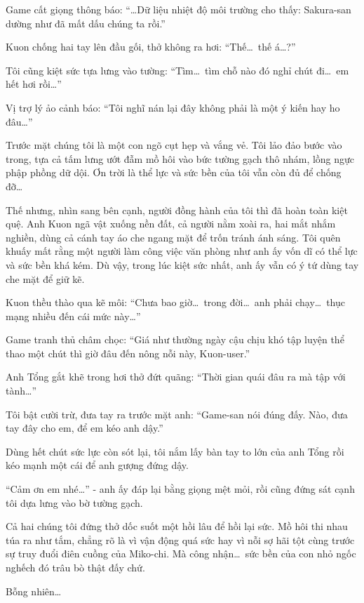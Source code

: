 \documentclass[../main.tex]{subfiles}
\begin{document}
Game cất giọng thông báo: ``\dots Dữ liệu nhiệt độ môi trường cho thấy: Sakura-san dường như đã mất dấu chúng ta rồi.''

Kuon chống hai tay lên đầu gối, thở không ra hơi: ``Thế\dots\ thế á\dots?''

Tôi cũng kiệt sức tựa lưng vào tường: ``Tìm\dots\ tìm chỗ nào đó nghỉ chút đi\dots\ em hết hơi rồi\dots''

Vị trợ lý ảo cảnh báo: ``Tôi nghĩ nán lại đây không phải là một ý kiến hay ho đâu\dots''

Trước mặt chúng tôi là một con ngõ cụt hẹp và vắng vẻ. Tôi lảo đảo bước vào trong, tựa cả tấm lưng ướt đẫm mồ hôi vào bức tường gạch thô nhám, lồng ngực phập phồng dữ dội. Ơn trời là thể lực và sức bền của tôi vẫn còn đủ để chống đỡ\dots

Thế nhưng, nhìn sang bên cạnh, người đồng hành của tôi thì đã hoàn toàn kiệt quệ. Anh Kuon ngã vật xuống nền đất, cả người nằm xoài ra, hai mắt nhắm nghiền, dùng cả cánh tay áo che ngang mặt để trốn tránh ánh sáng. Tôi quên khuấy mất rằng một người làm công việc văn phòng như anh ấy vốn dĩ có thể lực và sức bền khá kém. Dù vậy, trong lúc kiệt sức nhất, anh ấy vẫn có ý tứ dùng tay che mặt để giữ kẽ.


Kuon thều thào qua kẽ môi: ``Chưa bao giờ\dots\ trong đời\dots\ anh phải chạy\dots\ thục mạng nhiều đến cái mức này\dots''

Game tranh thủ châm chọc: ``Giá như thường ngày cậu chịu khó tập luyện thể thao một chút thì giờ đâu đến nông nỗi này, Kuon-user.''

Anh Tổng gắt khẽ trong hơi thở đứt quãng: ``Thời gian quái đâu ra mà tập với tành\dots''

Tôi bật cười trừ, đưa tay ra trước mặt anh: ``Game-san nói đúng đấy. Nào, đưa tay đây cho em, để em kéo anh dậy.''

Dùng hết chút sức lực còn sót lại, tôi nắm lấy bàn tay to lớn của anh Tổng rồi kéo mạnh một cái để anh gượng đứng dậy.

``Cảm ơn em nhé\dots'' - anh ấy đáp lại bằng giọng mệt mỏi, rồi cũng đứng sát cạnh tôi dựa lưng vào bờ tường gạch.

Cả hai chúng tôi đứng thở dốc suốt một hồi lâu để hồi lại sức. Mồ hôi thi nhau túa ra như tắm, chẳng rõ là vì vận động quá sức hay vì nỗi sợ hãi tột cùng trước sự truy đuổi điên cuồng của Miko-chi. Mà công nhận\dots\ sức bền của con nhỏ ngốc nghếch đó trâu bò thật đấy chứ.

Bỗng nhiên\dots
\end{document}
